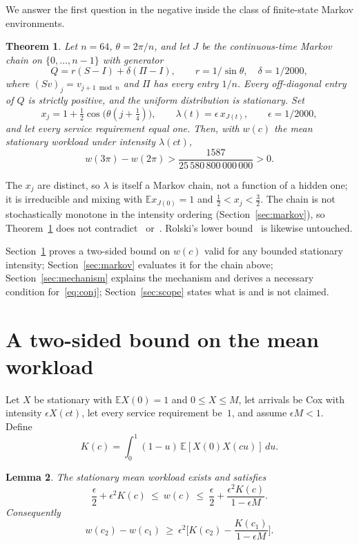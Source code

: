 \documentclass[11pt]{article}
\newcommand{\E}{\mathbb{E}}
\newcommand{\eps}{\epsilon}
\newtheorem{theorem}{Theorem}
\newtheorem{lemma}[theorem]{Lemma}
\theoremstyle{remark}
\begin{document}
We answer the first question in the negative inside the class of finite-state Markov environments.

\begin{theorem}\label{thm:main}
Let $n=64$, $\theta=2\pi/n$, and let $J$ be the continuous-time Markov chain on $\{0,\dots,n-1\}$ with generator
\begin{equation}
Q=r(S-I)+\delta(\Pi-I),\qquad r=1/\sin\theta,\quad \delta=1/2000,
\label{eq:generator}
\end{equation}
where $(Sv)_j=v_{j+1\bmod n}$ and $\Pi$ has every entry $1/n$. Every off-diagonal entry of $Q$ is strictly positive, and the uniform distribution is stationary. Set
\[
x_j=1+\tfrac12\cos\!\big(\theta(j+\tfrac14)\big),\qquad \lambda(t)=\eps\,x_{J(t)},\qquad \eps=1/2000,
\]
and let every service requirement equal one. Then, with $w(c)$ the mean stationary workload under intensity $\lambda(ct)$,
\[
w(3\pi)-w(2\pi)>\frac{1587}{25\,580\,800\,000\,000}>0 .
\]
\end{theorem}

The $x_j$ are distinct, so $\lambda$ is itself a Markov chain, not a function of a hidden one; it is irreducible and mixing with $\E x_{J(0)}=1$ and $\tfrac12<x_j<\tfrac32$. The chain is not stochastically monotone in the intensity ordering (Section~\ref{sec:markov}), so Theorem~\ref{thm:main} does not contradict~\cite{br} or~\cite{ccp}. Rolski's lower bound~\cite{rolski81} is likewise untouched.

Section~\ref{sec:bound} proves a two-sided bound on $w(c)$ valid for any bounded stationary intensity; Section~\ref{sec:markov} evaluates it for the chain above; Section~\ref{sec:mechanism} explains the mechanism and derives a necessary condition for~\eqref{eq:conj}; Section~\ref{sec:scope} states what is and is not claimed.

\section{A two-sided bound on the mean workload}\label{sec:bound}

Let $X$ be stationary with $\E X(0)=1$ and $0\le X\le M$, let arrivals be Cox with intensity $\eps X(ct)$, let every service requirement be~$1$, and assume $\eps M<1$. Define
\begin{equation}
K(c)=\int_0^1(1-u)\,\E[X(0)X(cu)]\,du.
\label{eq:K}
\end{equation}

\begin{lemma}\label{lem:bound}
The stationary mean workload exists and satisfies
\begin{equation}
\frac{\eps}{2}+\eps^2K(c)\ \le\ w(c)\ \le\ \frac{\eps}{2}+\frac{\eps^2K(c)}{1-\eps M}.
\label{eq:bound}
\end{equation}
Consequently
\begin{equation}
w(c_2)-w(c_1)\ \ge\ \eps^2\Big[K(c_2)-\frac{K(c_1)}{1-\eps M}\Big].
\label{eq:comparison}
\end{equation}
\end{lemma}
\end{document}
